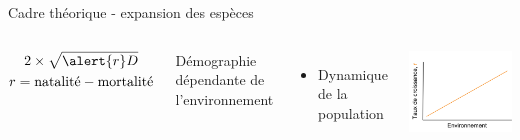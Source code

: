 \documentclass[11pt, compress, aspectratio=1610]{beamer}
\providecommand{\tightlist}{%
  \setlength{\itemsep}{0pt}\setlength{\parskip}{0pt}}
\newcommand{\begincols}{\begin{columns}}
\newcommand{\stopcols}{\end{columns}}
\begin{document}
\begin{frame}{Cadre théorique - expansion des espèces}
\protect\hypertarget{cadre-thuxe9orique---expansion-des-espuxe8ces-1}{}

\begincols
{}
\begin{Large}
  \begin{gather*}
    2 \times \sqrt{\alert{r}D} \\
    r = \text{natalité} - \text{mortalité}
  \end{gather*}
\end{Large}

\alert{Démographie} dépendante de l’environnement

\begin{itemize}
\tightlist
\item
  Dynamique de la population
\end{itemize}

\hfill{}
  \centering

\includegraphics[scale=0.43]{figures/croissance.png}

\par
\stopcols

\end{frame}
\end{document}
